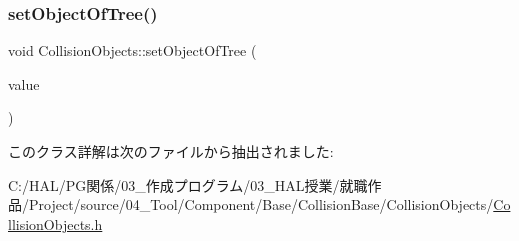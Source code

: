 \mbox{\label{class_collision_objects_a3d5a69741d66dcdebfae5a54a15c4b88}} 
\subsubsection{\texorpdfstring{set\+Object\+Of\+Tree()}{setObjectOfTree()}}
{\footnotesize\ttfamily void Collision\+Objects\+::set\+Object\+Of\+Tree (\begin{DoxyParamCaption}\item[{\mbox{\hyperlink{class_object_of_tree}{Object\+Of\+Tree}}$<$ \mbox{\hyperlink{class_collision_objects}{Collision\+Objects}} $\ast$$>$ $\ast$}]{value }\end{DoxyParamCaption})\hspace{0.3cm}{\ttfamily [inline]}}



このクラス詳解は次のファイルから抽出されました\+:\begin{DoxyCompactItemize}
\item 
C\+:/\+H\+A\+L/\+P\+G関係/03\+\_\+作成プログラム/03\+\_\+\+H\+A\+L授業/就職作品/\+Project/source/04\+\_\+\+Tool/\+Component/\+Base/\+Collision\+Base/\+Collision\+Objects/\mbox{\hyperlink{_collision_objects_8h}{Collision\+Objects.\+h}}\end{DoxyCompactItemize}
